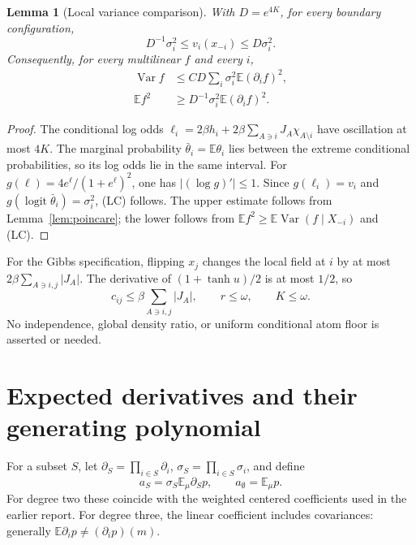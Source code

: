 \documentclass[11pt]{article}
\newtheorem{lemma}[theorem]{Lemma}
\newcommand{\E}{\mathbb E}
\newcommand{\Var}{\operatorname{Var}}
\begin{document}
\begin{lemma}[Local variance comparison]\label{lem:local}
With $D=e^{4K}$, for every boundary configuration,
\[
 D^{-1}\sigma_i^2\le v_i(x_{-i})\le D\sigma_i^2.
 \tag{LC}
\]
Consequently, for every multilinear $f$ and every $i$,
\begin{align}
 \Var f&\le CD\sum_i\sigma_i^2\E(\partial_i f)^2,
 \label{eq:upper}\\
 \E f^2&\ge D^{-1}\sigma_i^2\E(\partial_i f)^2.
 \label{eq:lower}
\end{align}
\end{lemma}
\begin{proof}
The conditional log odds
$\ell_i=2\beta h_i+2\beta\sum_{A\ni i}J_A\chi_{A\setminus i}$
have oscillation at most $4K$. The marginal probability
$\bar\theta_i=\E\theta_i$ lies between the extreme conditional
probabilities, so its log odds lie in the same interval. For
$g(\ell)=4e^\ell/(1+e^\ell)^2$, one has $|(\log g)'|\le1$.
Since $g(\ell_i)=v_i$ and $g(\operatorname{logit}\bar\theta_i)
=\sigma_i^2$, (LC) follows. The upper estimate follows from
Lemma~\ref{lem:poincare}; the lower follows from
$\E f^2\ge\E\Var(f\mid X_{-i})$ and (LC).
\end{proof}

For the Gibbs specification, flipping $x_j$ changes the local field
at $i$ by at most $2\beta\sum_{A\ni i,j}|J_A|$. The derivative of
$(1+\tanh u)/2$ is at most $1/2$, so
\[
 c_{ij}\le\beta\sum_{A\ni i,j}|J_A|,\qquad r\le\omega,
 \qquad K\le\omega.
 \tag{DS}
\]
No independence, global density ratio, or uniform conditional atom
floor is asserted or needed.

\section{Expected derivatives and their generating polynomial}

For a subset $S$, let $\partial_S=\prod_{i\in S}\partial_i$,
$\sigma_S=\prod_{i\in S}\sigma_i$, and define
\[
 a_S=\sigma_S\E_\mu\partial_Sp,\qquad
 a_\emptyset=\E_\mu p.
\]
For degree two these coincide with the weighted centered coefficients
used in the earlier report. For degree three, the linear coefficient
includes covariances: generally
$\E\partial_i p\ne(\partial_i p)(m)$.
\end{document}
